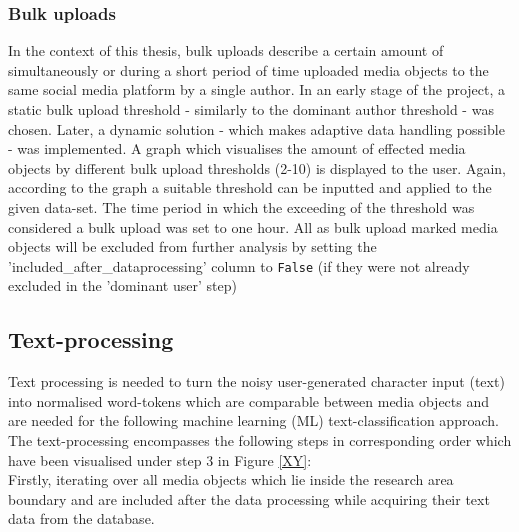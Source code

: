 \subsubsection{Bulk uploads} \label{bias_bulk_uploads}
In the context of this thesis, bulk uploads describe a certain amount of simultaneously or during a short period of time uploaded media objects to the same social media platform by a single author. In an early stage of the project, a static bulk upload threshold - similarly to the dominant author threshold - was chosen. Later, a dynamic solution - which makes adaptive data handling possible - was implemented. A graph which visualises the amount of effected media objects by different bulk upload thresholds (2-10) is displayed to the user. Again, according to the graph a suitable threshold can be inputted and applied to the given data-set. The time period in which the exceeding of the threshold was considered a bulk upload was set to one hour. 
All as bulk upload marked media objects will be excluded from further analysis by setting the 'included\_after\_dataprocessing' column to \texttt{False} (if they were not already excluded in the 'dominant user' step)

\subsection{Text-processing} \label{text_processing}
Text processing is needed to turn the noisy user-generated character input (text) into normalised word-tokens which are comparable between media objects and are needed for the following machine learning (ML) text-classification approach. The text-processing encompasses the following steps in corresponding order which have been visualised under step 3 in Figure \ref{XY}:\\
Firstly, iterating over all media objects which lie inside the research area boundary and are included after the data processing while acquiring their text data from the database.

